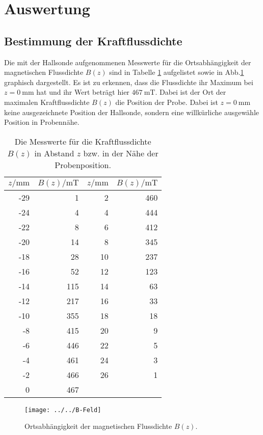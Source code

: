 \section{Auswertung}
\label{sec:Auswertung}
\subsection{Bestimmung der Kraftflussdichte}
Die mit der Hallsonde aufgenommenen Messwerte für die Ortsabhängigkeit der magnetischen Flussdichte $B(z)$ sind in Tabelle \ref{tab:messwerte} aufgelistet sowie in Abb.\ref{fig:b-feld} graphisch dargestellt. Es ist zu erkennen, dass die Flussdichte ihr Maximum bei $z = \SI{0}{\milli\meter}$ hat und ihr Wert beträgt hier $\SI{467}{\milli\tesla}$. Dabei ist der Ort der maximalen Kraftflussdichte $B(z)$ die Position der Probe. Dabei ist $z= \SI{0}{\milli\meter}$ keine ausgezeichnete Position der Hallsonde, sondern eine willkürliche ausgewähle Position in Probennähe.

\begin{table}[htpb]
	\centering
	\caption{Die Messwerte für die Kraftflussdichte $B(z)$ in Abstand $z$ bzw. in der Nähe der Probenposition.}
	\label{tab:messwerte}
	\begin{tabular}{r|r|r|r}
		\toprule
		$z/\si{\milli\meter}$	&	$B(z) / \si{\milli\tesla}$ &	$z/\si{\milli\meter}$ &  $B(z) / \si{\milli\tesla}$\\
		\hline
		-29	&	1 &2&460\\
		-24	&	4 &4&444\\
		-22	&	8 &6&412\\
		-20	&	14&8&345\\
		-18	&	28&10&237\\
		-16	&	52&12&123\\
		-14	&	115&14&63\\
		-12	&	217&16&33\\
		-10	&	355&18&18\\
		-8	&	415&20&9\\
		-6	&	446&22&5\\
		-4	&	461&24&3\\
		-2	&	466&26&1 \\
		0   &   467&&\\
		\bottomrule
	\end{tabular}
\end{table}

\begin{figure}[h!]
	\centering
	\texttt{[image: ../../B-Feld]}
	\caption{Ortsabhängigkeit der magnetischen Flussdichte $B(z)$.}
	\label{fig:b-feld}
\end{figure}

